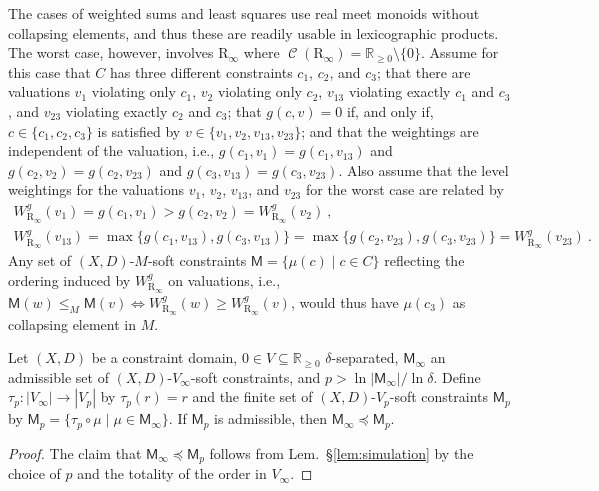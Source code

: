 \documentclass[english]{notes}
\newcommand{\RZ}{\mathbb{R}}
\newcommand{\RZp}{\RZ_{\geq 0}}
\newcommand{\compfun}{\mathbin{\circ}}
\DeclareMathOperator{\collapseset}{\mathcal{C}}
\begin{document}
The cases of weighted sums and least squares use real meet monoids
without collapsing elements, and thus these are readily usable in
lexicographic products.  The worst case, however, involves
$\mathrm{R}_{\infty}$ where $\collapseset(\mathrm{R}_{\infty}) = \RZp
\setminus \{ 0 \}$. Assume for this case that $C$ has three different
constraints $c_1$, $c_2$, and $c_3$; that there are valuations $v_1$
violating only $c_1$, $v_2$ violating only $c_2$, $v_{13}$ violating
exactly $c_1$ and $c_3$, and $v_{23}$ violating exactly $c_2$ and
$c_3$; that $g(c, v) = 0$ if, and only if, $c \in \{ c_1, c_2, c_3 \}$
is satisfied by $v \in \{ v_1, v_2, v_{13}, v_{23} \}$; and that the
weightings are independent of the valuation, i.e., $g(c_1, v_1) =
g(c_1, v_{13})$ and $g(c_2, v_2) = g(c_2, v_{23})$ and $g(c_3, v_{13})
= g(c_3, v_{23})$.  Also assume that the level weightings for the
valuations $v_1$, $v_2$, $v_{13}$, and $v_{23}$ for the worst case are
related by
%
\begin{gather*}
  W^g_{\mathrm{R}_{\infty}}(v_1) = g(c_1, v_1) > g(c_2, v_2) = W^g_{\mathrm{R}_{\infty}}(v_2)
\ \text{,}
\\
  W^g_{\mathrm{R}_{\infty}}(v_{13}) = \max \{ g(c_1, v_{13}), g(c_3, v_{13}) \} = \max \{
  g(c_2, v_{23}), g(c_3, v_{23}) \} = W^g_{\mathrm{R}_{\infty}}(v_{23})
\ \text{.}
\end{gather*}
%
Any set of $(X, D)$-$M$-soft constraints
$\mathsf{M} = \{ \mu(c) \mid c \in C \}$ reflecting the ordering
induced by $W^g_{\mathrm{R}_{\infty}}$ on valuations, i.e.,
$\mathsf{M}(w) \leq_M \mathsf{M}(v) \iff W^g_{\mathrm{R}_{\infty}}(w)
\geq W^g_{\mathrm{R}_{\infty}}(v)$,
would thus have $\mu(c_3)$ as collapsing element in $M$.

\begin{proposition}
Let $(X, D)$ be a constraint domain, $0 \in V \subseteq \RZp$
$\delta$-separated, $\mathsf{M}_{\infty}$ an admissible set of
$(X, D)$-$V_{\infty}$-soft constraints, and
$p > \ln |\mathsf{M}_{\infty}|/\ln \delta$.  Define
$\tau_p : |V_{\infty}| \to |V_p|$ by $\tau_p(r) = r$ and the finite
set of $(X, D)$-$V_p$-soft constraints $\mathsf{M}_p$ by
$\mathsf{M}_p = \{ \tau_p \compfun \mu \mid \mu \in
\mathsf{M}_{\infty} \}$.
If $\mathsf{M}_p$ is admissible, then
$\mathsf{M}_{\infty} \preccurlyeq \mathsf{M}_{p}$.
\end{proposition}
\begin{proof}
The claim that $\mathsf{M}_{\infty} \preccurlyeq \mathsf{M}_{p}$
follows from Lem.~§\ref{lem:simulation} by the choice of $p$ and the
totality of the order in $V_{\infty}$.
\end{proof}
\end{document}
